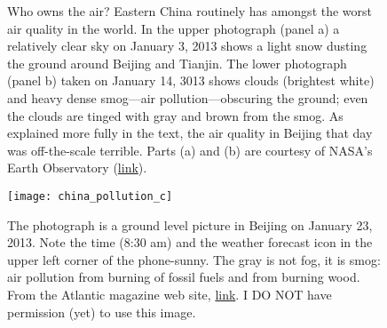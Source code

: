 \documentclass[amstex,12pt]{book}
\begin{document}
\begin{figure}[p]
\centering
{}


\caption{Who owns the air? Eastern China routinely has amongst the worst air quality in the world. In the upper photograph (panel a) a relatively clear sky on January 3, 2013 shows a light snow dusting the ground around Beijing and Tianjin. The lower photograph (panel b) taken on January 14, 3013 shows clouds (brightest white) and heavy dense smog---air pollution---obscuring the ground; even the clouds are tinged with gray and brown from the smog. As explained more fully in the text, the air quality in Beijing that day was off-the-scale terrible.  Parts (a) and (b) are courtesy of NASA’s Earth Observatory (\href{http://earthobservatory.nasa.gov/IOTD/view.php?id=80152&src=ve}{link}).}
\label{fig:china_pollution_ab}

\end{figure}

\newpage
\begin{figure}[p]
\centering
\texttt{[image: china\_pollution\_c]}%

\caption{The photograph is a ground level picture in Beijing on January 23, 2013. Note the time (8:30 am) and the weather forecast icon in the upper left corner of the phone-sunny. The gray is not fog, it is smog: air pollution from burning of fossil fuels and from burning wood. From the Atlantic magazine web site, \href{http://www.theatlantic.com/photo/2013/01/chinas-toxic-sky/100449/}{link}. I DO NOT have permission (yet) to use this image.}

\label{fig:china_pollution_c}

\end{figure}
\end{document}
